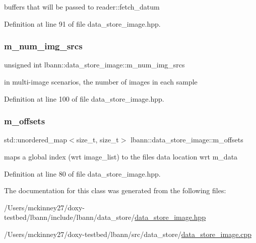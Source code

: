buffers that will be passed to reader\+::fetch\+\_\+datum 



Definition at line 91 of file data\+\_\+store\+\_\+image.\+hpp.

\mbox{\label{classlbann_1_1data__store__image_a2f660053e7621a9cc70a7c4eef53c9cc}} 
\subsubsection{\texorpdfstring{m\+\_\+num\+\_\+img\+\_\+srcs}{m\_num\_img\_srcs}}
{\footnotesize\ttfamily unsigned int lbann\+::data\+\_\+store\+\_\+image\+::m\+\_\+num\+\_\+img\+\_\+srcs\hspace{0.3cm}{\ttfamily [protected]}}



in multi-\/image scenarios, the number of images in each sample 



Definition at line 100 of file data\+\_\+store\+\_\+image.\+hpp.

\mbox{\label{classlbann_1_1data__store__image_ae5a9ba5fb1bf4d3147743012b8099038}} 
\subsubsection{\texorpdfstring{m\+\_\+offsets}{m\_offsets}}
{\footnotesize\ttfamily std\+::unordered\+\_\+map$<$size\+\_\+t, size\+\_\+t$>$ lbann\+::data\+\_\+store\+\_\+image\+::m\+\_\+offsets\hspace{0.3cm}{\ttfamily [protected]}}

maps a global index (wrt image\+\_\+list) to the file\textquotesingle{}s data location wrt m\+\_\+data 

Definition at line 80 of file data\+\_\+store\+\_\+image.\+hpp.



The documentation for this class was generated from the following files\+:\begin{DoxyCompactItemize}
\item 
/\+Users/mckinney27/doxy-\/testbed/lbann/include/lbann/data\+\_\+store/\hyperlink{data__store__image_8hpp}{data\+\_\+store\+\_\+image.\+hpp}\item 
/\+Users/mckinney27/doxy-\/testbed/lbann/src/data\+\_\+store/\hyperlink{data__store__image_8cpp}{data\+\_\+store\+\_\+image.\+cpp}\end{DoxyCompactItemize}
